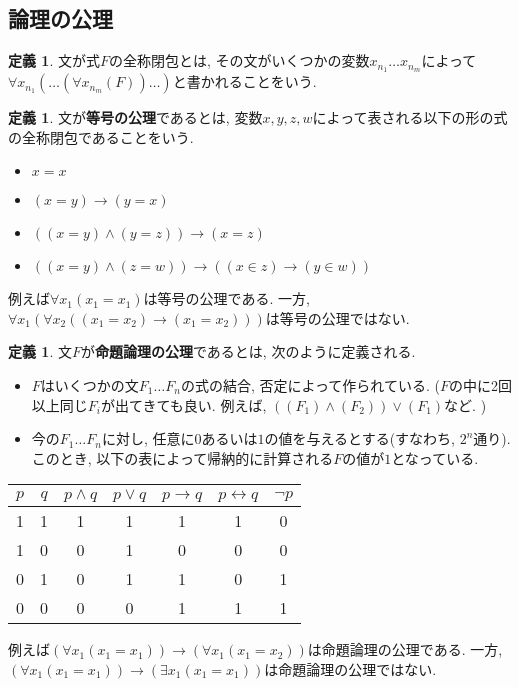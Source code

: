 \documentclass[a4paper, twoside]{bxjsarticle}
\theoremstyle{definition}
\newtheorem{defn}[thm]{定義}
\begin{document}
    \subsection{論理の公理}
    \begin{defn}
        文が式$F$の全称閉包とは, その文がいくつかの変数$x_{n_1} \dots x_{n_m}$によって$\forall x_{n_1} (\dots (\forall x_{n_m} (F)) \dots)$と書かれることをいう. 
    \end{defn}
    \begin{defn}
        文が\textbf{等号の公理}であるとは, 変数$x,y,z,w$によって表される以下の形の式の全称閉包であることをいう.
        \begin{itemize}
            \item $x=x$
            \item $(x=y) \to (y=x)$
            \item $((x=y) \land (y=z)) \to (x=z)$
            \item $((x=y) \land (z=w)) \to ((x \in z) \to (y \in w))$
            
        \end{itemize}
        
        例えば$\forall x_1 (x_1 = x_1)$は等号の公理である. 一方, $\forall x_1 (\forall x_2 ((x_1 = x_2) \to (x_1 = x_2)))$は等号の公理ではない. 
    \end{defn}
    \begin{defn}
        文$F$が\textbf{命題論理の公理}であるとは, 次のように定義される.
        
        \begin{itemize}
            \item $F$はいくつかの文$F_1 \dots F_n$の式の結合, 否定によって作られている. ($F$の中に2回以上同じ$F_i$が出てきても良い. 例えば, $((F_1) \land (F_2)) \lor (F_1)$など. )
            \item 今の$F_1 \dots F_n$に対し, 任意に$0$あるいは$1$の値を与えるとする(すなわち, $2^n$通り). このとき, 以下の表によって帰納的に計算される$F$の値が$1$となっている.
        \end{itemize}
        
        \begin{table}[htbp]
            \centering
            \begin{tabular}{c|c|c|c|c|c|c}
                $p$ & $q$ & $p \land q$ & $p \lor q$ & $p \to q$ & $p \leftrightarrow q$ & $\lnot p$ \\ \hline
                1 & 1 & 1 & 1 & 1 & 1 & 0 \\ \hline
                1 & 0 & 0 & 1 & 0 & 0 & 0 \\ \hline
                0 & 1 & 0 & 1 & 1 & 0 & 1 \\ \hline
                0 & 0 & 0 & 0 & 1 & 1 & 1 \\ \hline
            \end{tabular}
        \end{table}
        
        例えば$(\forall x_1 (x_1 = x_1)) \to (\forall x_1 (x_1 = x_2))$は命題論理の公理である. 一方, $(\forall x_1 (x_1 = x_1)) \to (\exists x_1 (x_1 = x_1))$は命題論理の公理ではない.
    \end{defn}
\end{document}
